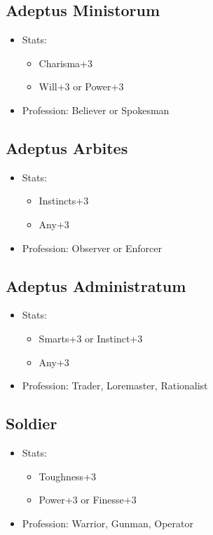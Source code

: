 \subsection{Adeptus Ministorum}
\begin{itemize}
	\item Stats:
	\begin{itemize}
		\item Charisma+3
		\item Will+3 or Power+3
	\end{itemize}
	\item Profession: Believer or Spokesman
\end{itemize}

\subsection{Adeptus Arbites}
\begin{itemize}
	\item Stats:
	\begin{itemize}
		\item Instincts+3
		\item Any+3
	\end{itemize}
	\item Profession: Observer or Enforcer
\end{itemize}

\subsection{Adeptus Administratum}
\begin{itemize}
	\item Stats:
	\begin{itemize}
		\item Smarts+3 or Instinct+3
		\item Any+3
	\end{itemize}
	\item Profession: Trader, Loremaster, Rationalist
\end{itemize}

\subsection{Soldier}
\begin{itemize}
	\item Stats:
	\begin{itemize}
		\item Toughness+3
		\item Power+3 or Finesse+3
	\end{itemize}
	\item Profession: Warrior, Gunman, Operator
\end{itemize}

